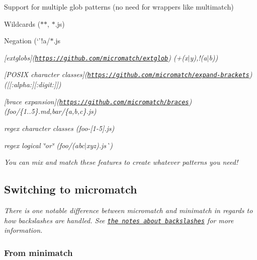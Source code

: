 \begin{DoxyItemize}
\item Support for multiple glob patterns (no need for wrappers like multimatch)
\item Wildcards ({\ttfamily $\ast$$\ast$}, {\ttfamily $\ast$.js})
\item Negation (`'!a/$\ast$.js\textquotesingle{}{\ttfamily ,}\textquotesingle{}{\itshape !(b).js\textquotesingle{}\mbox{]}{\ttfamily )}}
\item {\itshape {\ttfamily \mbox{[}extglobs\mbox{]}(\href{https://github.com/micromatch/extglob}{\tt https\+://github.\+com/micromatch/extglob}) (}+(x$\vert$y){\ttfamily ,}!(a$\vert$b){\ttfamily )}}
\item {\itshape {\ttfamily \mbox{[}P\+O\+S\+IX character classes\mbox{]}(\href{https://github.com/micromatch/expand-brackets}{\tt https\+://github.\+com/micromatch/expand-\/brackets}) (}\mbox{[}\mbox{[}\+:alpha\+:\mbox{]}\mbox{[}\+:digit\+:\mbox{]}\mbox{]}{\ttfamily )}}
\item {\itshape {\ttfamily \mbox{[}brace expansion\mbox{]}(\href{https://github.com/micromatch/braces}{\tt https\+://github.\+com/micromatch/braces}) (}foo/\{1..5\}.md{\ttfamily ,}bar/\{a,b,c\}.js{\ttfamily )}}
\item {\itshape {\ttfamily regex character classes (}foo-\/\mbox{[}1-\/5\mbox{]}.js{\ttfamily )}}
\item {\itshape {\ttfamily regex logical \char`\"{}or\char`\"{} (}foo/(abc$\vert$xyz).js\`{})}
\end{DoxyItemize}

{\itshape You can mix and match these features to create whatever patterns you need!}

{\itshape \subsection*{Switching to micromatch}}

{\itshape }

{\itshape There is one notable difference between micromatch and minimatch in regards to how backslashes are handled. See \href{#backslashes}{\tt the notes about backslashes} for more information.}

{\itshape \subsubsection*{From minimatch}}

{\itshape }

